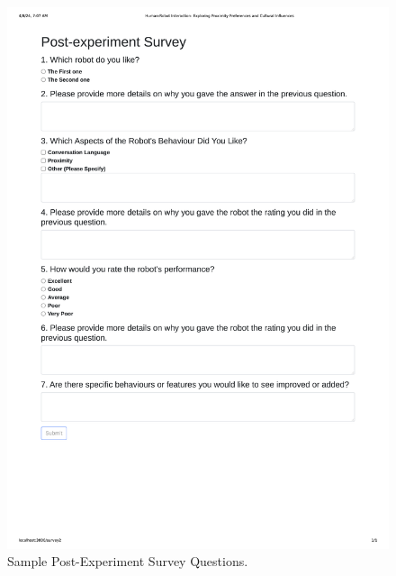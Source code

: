 \begin{figure}
    \begin{center}
        \noindent\includegraphics[width=\linewidth]{Appendices/survey2.png}  
        \caption{Sample Post-Experiment Survey Questions.}
        \label{fig:figure3}
    \end{center}
\end{figure}